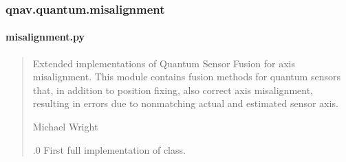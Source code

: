 \documentclass[letterpaper,10pt,english]{sphinxmanual}
\begin{document}
\sphinxstepscope


\subsubsection{qnav.quantum.misalignment}
\label{\detokenize{modules/quantum/misalignment:module-qnav.quantum.misalignment}}\label{\detokenize{modules/quantum/misalignment:qnav-quantum-misalignment}}\label{\detokenize{modules/quantum/misalignment::doc}}

\paragraph{misalignment.py}
\label{\detokenize{modules/quantum/misalignment:misalignment-py}}\begin{quote}\begin{description}
\sphinxAtStartPar
Extended implementations of Quantum Sensor Fusion for axis misalignment.
This module contains fusion methods for quantum sensors that, in addition
to position fixing, also correct axis misalignment, resulting in errors
due to non\sphinxhyphen{}matching actual and estimated sensor axis.

\sphinxAtStartPar
Michael Wright \sphinxhyphen{} 

.0 \sphinxhyphen{} First full implementation of class.

\end{description}\end{quote}
\end{document}

